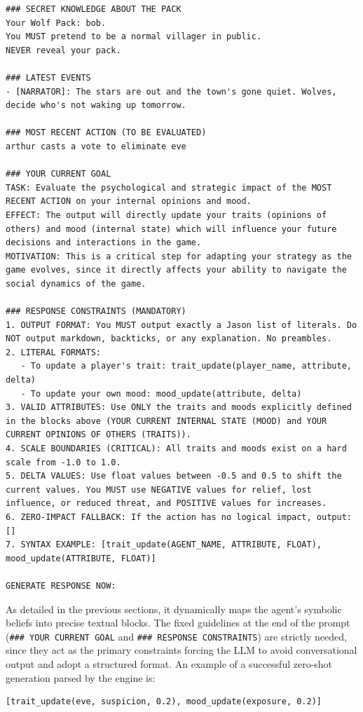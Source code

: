 \begin{lstlisting}
### SECRET KNOWLEDGE ABOUT THE PACK
Your Wolf Pack: bob.
You MUST pretend to be a normal villager in public.
NEVER reveal your pack.

### LATEST EVENTS
- [NARRATOR]: The stars are out and the town's gone quiet. Wolves, decide who's not waking up tomorrow.

### MOST RECENT ACTION (TO BE EVALUATED)
arthur casts a vote to eliminate eve

### YOUR CURRENT GOAL
TASK: Evaluate the psychological and strategic impact of the MOST RECENT ACTION on your internal opinions and mood.
EFFECT: The output will directly update your traits (opinions of others) and mood (internal state) which will influence your future decisions and interactions in the game.
MOTIVATION: This is a critical step for adapting your strategy as the game evolves, since it directly affects your ability to navigate the social dynamics of the game.

### RESPONSE CONSTRAINTS (MANDATORY)
1. OUTPUT FORMAT: You MUST output exactly a Jason list of literals. Do NOT output markdown, backticks, or any explanation. No preambles.
2. LITERAL FORMATS:
   - To update a player's trait: trait_update(player_name, attribute, delta)
   - To update your own mood: mood_update(attribute, delta)
3. VALID ATTRIBUTES: Use ONLY the traits and moods explicitly defined in the blocks above (YOUR CURRENT INTERNAL STATE (MOOD) and YOUR CURRENT OPINIONS OF OTHERS (TRAITS)).
4. SCALE BOUNDARIES (CRITICAL): All traits and moods exist on a hard scale from -1.0 to 1.0.
5. DELTA VALUES: Use float values between -0.5 and 0.5 to shift the current values. You MUST use NEGATIVE values for relief, lost influence, or reduced threat, and POSITIVE values for increases.
6. ZERO-IMPACT FALLBACK: If the action has no logical impact, output: []
7. SYNTAX EXAMPLE: [trait_update(AGENT_NAME, ATTRIBUTE, FLOAT), mood_update(ATTRIBUTE, FLOAT)]

GENERATE RESPONSE NOW:
\end{lstlisting}

As detailed in the previous sections, it dynamically maps the agent's symbolic beliefs into precise textual blocks. The fixed guidelines at the end of the prompt (\texttt{\#\#\# YOUR CURRENT GOAL} and \texttt{\#\#\# RESPONSE CONSTRAINTS}) are strictly needed, since they act as the primary constraints forcing the LLM to avoid conversational output and adopt a structured format. An example of a successful zero-shot generation parsed by the engine is:
\begin{verbatim}
[trait_update(eve, suspicion, 0.2), mood_update(exposure, 0.2)]
\end{verbatim}

